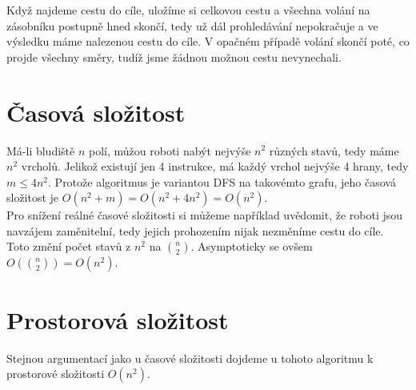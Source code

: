 \documentclass[11pt,a4paper]{article}
\begin{document}
Když najdeme cestu do cíle, uložíme si celkovou cestu a všechna volání na zásobníku postupně hned skončí, tedy už dál prohledávání nepokračuje a ve výsledku máme nalezenou cestu do cíle. V opačném případě volání skončí poté, co projde všechny směry, tudíž jsme žádnou možnou cestu nevynechali.
\section{Časová složitost}
Má-li bludiště $n$ polí, můžou roboti nabýt nejvýše $n^2$ různých stavů, tedy máme $n^2$ vrcholů. Jelikož existují jen 4 instrukce, má každý vrchol nejvýše 4 hrany, tedy $m\leq4n^2$. Protože algoritmus je variantou DFS na takovémto grafu, jeho časová složitost je $O(n^2+m) = O(n^2 + 4n^2) = O(n^2)$.\\

Pro snížení reálné časové složitosti si můžeme například uvědomit, že roboti jsou navzájem zaměnitelní, tedy jejich prohozením nijak nezměníme cestu do cíle. Toto změní počet stavů z $n^2$ na $n \choose 2$. Asymptoticky se ovšem $O({n \choose 2}) = O(n^2)$.
\section{Prostorová složitost}
Stejnou argumentací jako u časové složitosti dojdeme u tohoto algoritmu k prostorové složitosti $O(n^2)$.
\end{document}
